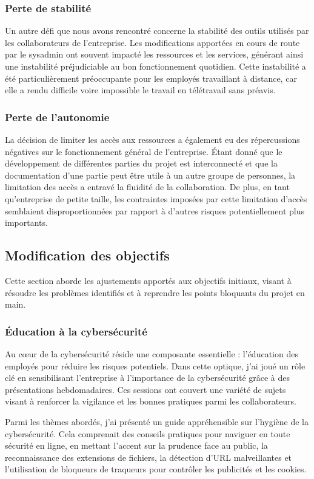 \subsubsection{Perte de stabilité}
Un autre défi que nous avons rencontré concerne la stabilité des outils utilisés par les collaborateurs de l'entreprise.
Les modifications apportées en cours de route par le sysadmin ont souvent impacté les ressources et les services, générant ainsi une instabilité préjudiciable au bon fonctionnement quotidien.
Cette instabilité a été particulièrement préoccupante pour les employés travaillant à distance, car elle a rendu difficile voire impossible le travail en télétravail sans préavis.

\subsubsection{Perte de l'autonomie}
La décision de limiter les accès aux ressources a également eu des répercussions négatives sur le fonctionnement général de l'entreprise.
Étant donné que le développement de différentes parties du projet est interconnecté et que la documentation d'une partie peut être utile à un autre groupe de personnes, la limitation des accès a entravé la fluidité de la collaboration.
De plus, en tant qu'entreprise de petite taille, les contraintes imposées par cette limitation d'accès semblaient disproportionnées par rapport à d'autres risques potentiellement plus importants.


\subsection{Modification des objectifs}
Cette section aborde les ajustements apportés aux objectifs initiaux, visant à résoudre les problèmes identifiés et à reprendre les points bloquants du projet en main.

\subsubsection{Éducation à la cybersécurité}
Au cœur de la cybersécurité réside une composante essentielle : l'éducation des employés pour réduire les risques potentiels.
Dans cette optique, j'ai joué un rôle clé en sensibilisant l'entreprise à l'importance de la cybersécurité grâce à des présentations hebdomadaires.
Ces sessions ont couvert une variété de sujets visant à renforcer la vigilance et les bonnes pratiques parmi les collaborateurs.

Parmi les thèmes abordés, j'ai présenté un guide appréhensible sur l'hygiène de la cybersécurité.
Cela comprenait des conseils pratiques pour naviguer en toute sécurité en ligne, en mettant l'accent sur la prudence face au public, la reconnaissance des extensions de fichiers, la détection d'URL malveillantes et l'utilisation de bloqueurs de traqueurs pour contrôler les publicités et les cookies.


